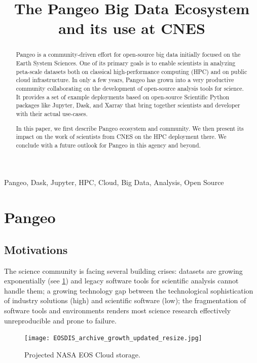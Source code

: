\documentclass{article}
\title{The Pangeo Big Data Ecosystem and its use at CNES}
\begin{document}
%
\maketitle
%
\begin{abstract}
Pangeo\cite{b1} is a community-driven effort for open-source big data initially
focused on the Earth System Sciences. One of its primary goals is to enable
scientists in analyzing peta-scale datasets both on classical high-performance
computing (HPC) and on public cloud infrastructure.  In only a few years, Pangeo
has grown into a very productive community collaborating on the development of
open-source analysis tools for science. 
It provides a set of example deployments based on open-source
Scientific Python packages like Jupyter\cite{b14}, Dask\cite{b12},
and Xarray\cite{b13} that bring together scientists and developer with their
actual use-cases.

In this paper, we first describe Pangeo ecosystem and community.
We then present its impact on the work of
scientists from CNES on the HPC deployment there.
We conclude with a future outlook for Pangeo in this agency and beyond.
\end{abstract}
%
\begin{keywords}
Pangeo, Dask, Jupyter, HPC, Cloud, Big Data, Analysis, Open Source
\end{keywords}
%
\section{Pangeo}
\label{sec:pangeo}

\subsection{Motivations}
\label{ssec:motivations}

The science community is facing several building crises: datasets are growing exponentially (see \ref{nasa_cloud_growth}) and legacy software tools for scientific analysis cannot handle them; a growing technology gap between the technological sophistication of industry solutions (high) and scientific software (low); the fragmentation of software tools and environments renders most science research effectively unreproducible and prone to failure.

\begin{figure}
  \centering
  \texttt{[image: EOSDIS\_archive\_growth\_updated\_resize.jpg]}
  \caption{\label{nasa_cloud_growth} Projected NASA EOS Cloud storage\cite{b2}.}
\end{figure}
\end{document}
